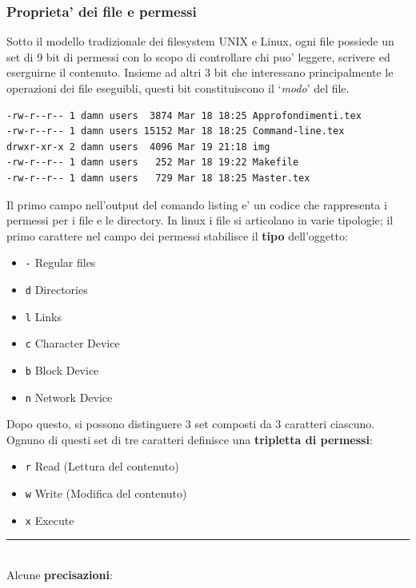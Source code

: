 \subsubsection{Proprieta' dei file e permessi}
Sotto il modello tradizionale dei filesystem UNIX e Linux, ogni file possiede un set di 9 bit di permessi con lo scopo di controllare chi puo' leggere, scrivere ed eserguirne il contenuto. Insieme ad altri 3 bit che interessano principalmente le operazioni dei file eseguibli, questi bit constituiscono il `\emph{modo}' del file.

\begin{lstlisting}[language=bash,basicstyle=\ttfamily,frame=single,caption={Output del comando \texttt{ls -l}},captionpos=b]
-rw-r--r-- 1 damn users  3874 Mar 18 18:25 Approfondimenti.tex
-rw-r--r-- 1 damn users 15152 Mar 18 18:25 Command-line.tex
drwxr-xr-x 2 damn users  4096 Mar 19 21:18 img
-rw-r--r-- 1 damn users   252 Mar 18 19:22 Makefile
-rw-r--r-- 1 damn users   729 Mar 18 18:25 Master.tex
\end{lstlisting}
Il primo campo nell'output del comando listing e' un codice che rappresenta i permessi per i file e le directory. In linux i file si articolano in varie tipologie; il primo carattere nel campo dei permessi stabilisce il \textbf{tipo} dell'oggetto:
\begin{itemize}
	\item \texttt{-} Regular files 
	\item \texttt{d} Directories 
	\item \texttt{l} Links 
	\item \texttt{c} Character Device 
	\item \texttt{b} Block Device 
	\item \texttt{n} Network Device 
\end{itemize}
Dopo questo, si possono distinguere 3 set composti da 3 caratteri ciascuno. Ognuno di questi set di tre caratteri definisce una \textbf{tripletta di permessi}:
\begin{itemize}
	\item \texttt{r} Read (Lettura del contenuto)
	\item \texttt{w} Write (Modifica del contenuto)
	\item \texttt{x} Execute 
\end{itemize}
\noindent\rule{16cm}{0.4pt}\\
Alcune \textbf{precisazioni}:
